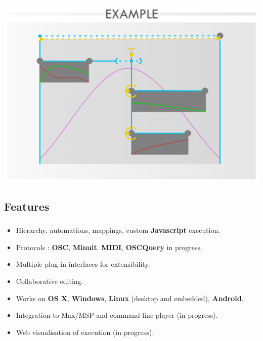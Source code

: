 \documentclass[12pt,t]{beamer}
\makeatletter
\newcommand*{\currentname}{\@currentlabelname}
\makeatother
\begin{document}
\begin{frame}
    \frametitle{\currentname}
    \centering
    \includegraphics[scale=0.065]{images/example.jpg}
\end{frame}

\subsection{Features}
\begin{frame}
    \frametitle{\currentname}
    \begin{itemize}
        \item Hierarchy, automations, mappings, custom \textbf{Javascript} execution.
        \item Protocols : \textbf{OSC}, \textbf{Minuit}. \textbf{MIDI}, \textbf{OSCQuery} in progress.
        \item Multiple plug-in interfaces for extensibility.
        \item Collaborative editing.
        \item Works on \textbf{OS X}, \textbf{Windows}, \textbf{Linux} (desktop and embedded), \textbf{Android}.
        \item Integration to Max/MSP and command-line player (in progress).
        \item Web visualisation of execution (in progress).
    \end{itemize}
\end{frame}
\end{document}
